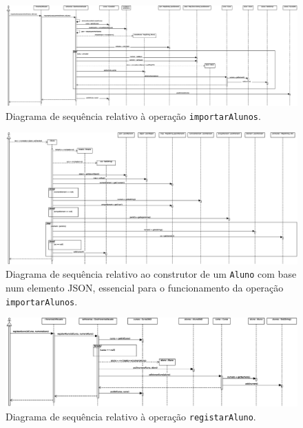 \documentclass[12pt, a4paper]{article}
\begin{document}
\begin{landscape}
        \vspace*{\fill}
        \pagebreak
        \vspace*{\fill}

        \begin{figure}[H]
            \centering
            \includegraphics[scale=0.40]{Imagens/Modelos/importarAlunosDAO.svg.eps}
            \caption{
                Diagrama de sequência relativo à operação \texttt{importarAlunos}.
            }
        \end{figure}

        \vspace*{\fill}
        \pagebreak
        \vspace*{\fill}

        \begin{figure}[H]
            \centering
            \includegraphics[scale=0.45]{Imagens/Modelos/importarAlunosConstrutorDAO.svg.eps}
            \caption{
                Diagrama de sequência relativo ao construtor de um \texttt{Aluno} com base num
                elemento JSON, essencial para o funcionamento da operação \texttt{importarAlunos}.
            }
        \end{figure}

        \vspace*{\fill}
        \pagebreak
        \vspace*{\fill}

        \begin{figure}[H]
            \centering
            \includegraphics[scale=0.60]{Imagens/Modelos/registarAlunoDAO.svg.eps}
            \caption{
                Diagrama de sequência relativo à operação \texttt{registarAluno}.
            }
        \end{figure}


\end{landscape}
\end{document}

